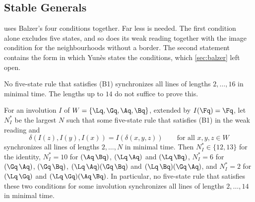 
\subsection{Stable Generals}\label{sec:stable}

 uses Balzer's four conditions together. Far less is needed. The
first condition alone excludes five states, and so does its weak reading
together with the image condition for the neighbourhoods without a border. The
second statement contains the form in which Yun\`es states the conditions, which
\cref{sec:balzer} left open.

\begin{theorem}\label{thm:stable}
No five-state rule that satisfies \textup{(B1)} synchronizes all lines of
lengths $2,\dots,16$ in minimal time. The lengths up to $14$ do not suffice to
prove this.
\end{theorem}

\begin{proposition}\label{prop:weakimage}
For an involution $I$ of $W=\{\Lq,\Gq,\Aq,\Bq\}$, extended by $I(\Fq)=\Fq$, let
$N^\ast_I$ be the largest $N$ such that some five-state rule that satisfies
\textup{(B1)} in the weak reading and
\begin{equation}\label{eq:B2o}
\delta(I(z),I(y),I(x))=I(\delta(x,y,z))\qquad\text{for all }x,y,z\in W
\end{equation}
synchronizes all lines of lengths $2,\dots,N$ in minimal time. Then
$N^\ast_I\in\{12,13\}$ for the identity, $N^\ast_I=10$ for
$(\Aq\,\Bq)$, $(\Lq\,\Aq)$ and $(\Lq\,\Bq)$, $N^\ast_I=6$ for $(\Gq\,\Aq)$,
$(\Gq\,\Bq)$, $(\Lq\,\Aq)(\Gq\,\Bq)$ and $(\Lq\,\Bq)(\Gq\,\Aq)$, and $N^\ast_I=2$
for $(\Lq\,\Gq)$ and $(\Lq\,\Gq)(\Aq\,\Bq)$. In particular, no five-state rule that
satisfies these two conditions for some involution synchronizes all lines of
lengths $2,\dots,14$ in minimal time.
\end{proposition}

